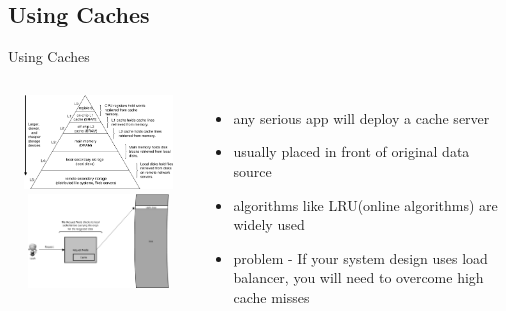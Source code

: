 \documentclass[9pt]{beamer}
\begin{document}
\subsection{Using Caches}
\begin{frame}{Using Caches}
  \begin{columns}
    \includegraphics[width=50mm, height=25mm, scale=0.1]{img/mem_hierarchy.png}
    \includegraphics[width=50mm, height=25mm, scale=0.1]{img/simple_cache.png}
    \begin{itemize}
    \item any serious app will deploy a cache server
    \item usually placed in front of original data source
    \item algorithms like LRU(online algorithms) are widely used
    \item problem - If your system design uses load balancer, you will need to overcome high cache misses
    \end{itemize}
  \end{columns}
\end{frame}

\end{document}
